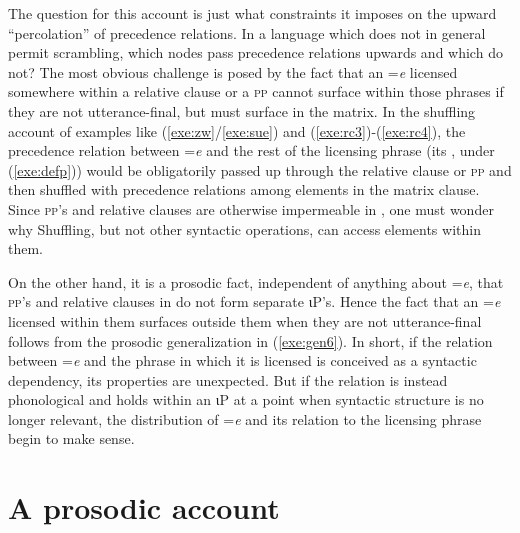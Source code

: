\documentclass[output=paper,
modfonts
]{LSP/langsci}
\begin{document}
\largerpage
The question for this account is just what constraints it imposes on the upward ``percolation'' of 
precedence relations. In a language which does not in general permit scrambling, which nodes pass precedence relations upwards and which do not?
The most obvious challenge is posed by the fact that an =\emph{e} licensed somewhere within a relative clause or a \textsc{pp} cannot surface
within those phrases if they are not utterance-final, but must surface in the matrix.  
In the shuffling account of examples like (\ref{exe:zw}/\ref{exe:sue}) and (\ref{exe:rc3})-(\ref{exe:rc4}),
 the precedence relation between =\emph{e} and the rest of the licensing phrase (its , under (\ref{exe:defp})) would be obligatorily
passed up through the relative clause or \textsc{pp} and then shuffled with precedence relations among elements  in the matrix clause. 
Since \textsc{pp}'s and relative clauses are otherwise impermeable in , one must 
 wonder why Shuffling, but not other syntactic operations, can access elements within them. 
 
 On the other hand, it is a prosodic fact, independent of anything about =\emph{e}, that \textsc{pp}'s and relative clauses in 
  do not form separate ιP's. Hence the fact that  an =\emph{e} licensed within them surfaces outside them when they
 are not utterance-final follows from the prosodic generalization in (\ref{exe:gen6}).  
 In short, if the relation between =\emph{e} and the phrase in which it is licensed is conceived as a syntactic dependency, 
 its properties are unexpected. 
But if the relation is instead phonological and holds 
 within an ιP at a point when syntactic structure is no longer relevant, the distribution of =\emph{e} and
its relation to the licensing phrase begin to make sense.

\section{A prosodic account}
\end{document}
